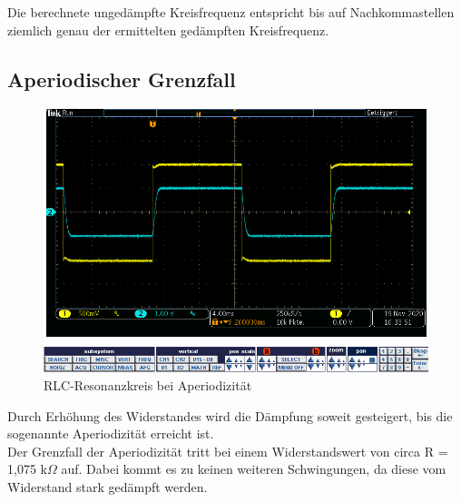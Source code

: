 \documentclass{article}
\begin{document}
Die berechnete ungedämpfte Kreisfrequenz entspricht bis auf Nachkommastellen ziemlich genau der ermittelten gedämpften Kreisfrequenz.

\subsection{Aperiodischer Grenzfall}

\begin{figure}[h]
  \begin{center}
    \includegraphics[scale=0.5]{../assets/images/ETP3/Aufgabe2AperiodischerGrenzfall.PNG}
    \caption{RLC-Resonanzkreis bei Aperiodizität}
  \end{center}
\end{figure}

Durch Erhöhung des Widerstandes wird die Dämpfung soweit gesteigert, bis die sogenannte Aperiodizität erreicht ist.\\
Der Grenzfall der Aperiodizität tritt bei einem Widerstandswert von circa R = 1,075 k$\Omega$ auf.
Dabei kommt es zu keinen weiteren Schwingungen, da diese vom Widerstand stark gedämpft werden.
\end{document}
